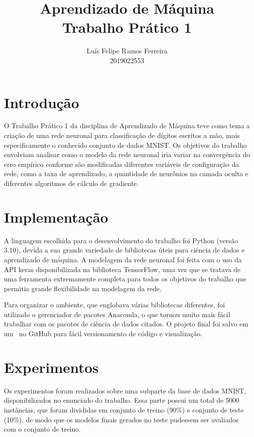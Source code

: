 \documentclass{article}
\title{Aprendizado de Máquina \\ Trabalho Prático 1}
\author{Luís Felipe Ramos Ferreira \\ 2019022553}
\begin{document}
\maketitle

\section{Introdução}

O Trabalho Prático 1 da disciplina de Aprendizado de Máquina teve como tema a criação de uma rede neuronal para classificação de dígitos escritos a mão, mais especificamente o conhecido conjunto de dados MNIST. Os objetivos do trabalho envolviam analisar como o modelo da rede neuronal iria variar na convergência do erro empírico conforme são modificadas diferentes variáveis de configuração da rede, como a taxa de aprendizado, a quantidade de neurônios na camada oculta e diferentes algoritmos de cálculo de gradiente.

\section{Implementação}

A linguagem escolhida para o desenvolvimento do trabalho foi Python (versão 3.10), devida a sua grande variedade de bibliotecas úteis para ciência de dados e aprendizado de máquina. A modelagem da rede neuronal foi feita com o uso da API keras disponibilizada na biblioteca TensorFlow, uma vez que se tratava de uma ferramenta extremamente completa para todos os objetivos do trabalho que permitia grande flexibilidade na modelagem da rede.

Para organizar o ambiente, que englobava várias bibliotecas diferentes, foi utilizado o gerenciador de pacotes Anaconda, o que tornou muito mais fácil trabalhar com os pacotes de ciência de dados citados. O projeto final foi salvo em um~\cite[repositório]{Ramos_Ferreira_MNIST-MLP_2022} no GitHub
para fácil versionamento de código e visualização.

\section{Experimentos}

Os experimentos foram realizados sobre uma subparte da base de dados MNIST, disponibilizados no enunciado do trabalho. Essa parte possui um total de 5000 instâncias, que foram divididas em conjunto de treino (90\%) e conjunto de teste (10\%), de modo
que os modelos finais gerados no teste pudessem ser avaliados com o conjunto de treino.
\end{document}
